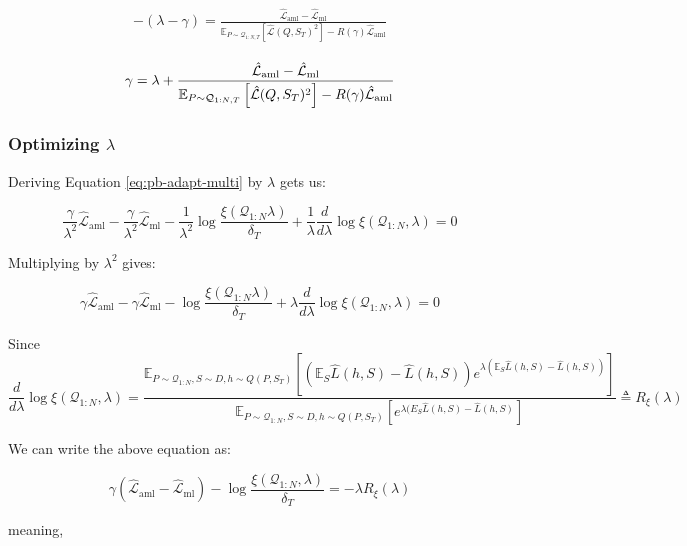 \documentclass{article}
\theoremstyle{definition}
\newcommand{\Expect}[2]{\mathbb{E}_{#1}\left [#2 \right ]}
\begin{document}
\begin{align*} 
\begin{split}
-(\lambda-\gamma) = \frac{\hat{\mathcal{L}}_{\mathrm{aml}}-\hat{\mathcal{L}}_{\mathrm{ml}}}{\Expect{P\sim \mathcal{Q}_{1:N,T}}{\hat{\mathcal{L}}(Q,S_T)^2}-R(\gamma)\hat{\mathcal{L}}_{\mathrm{aml}}}
\end{split}
\end{align*}

\begin{align} \label{eq:meta-pb-gamma}
\begin{split}
\gamma = \lambda+\frac{\hat{\mathcal{L}}_{\mathrm{aml}}-\hat{\mathcal{L}}_{\mathrm{ml}}}{\Expect{P\sim \mathcal{Q}_{1:N,T}}{\hat{\mathcal{L}}(Q,S_T)^2}-R(\gamma)\hat{\mathcal{L}}_{\mathrm{aml}}}
\end{split}\hfill
\end{align}

\subsubsection{Optimizing $\lambda$}

Deriving Equation \ref{eq:pb-adapt-multi} by $\lambda$ gets us:

$$\frac{\gamma}{\lambda^2} \hat{\mathcal{L}}_{\mathrm{aml}}-\frac{\gamma}{\lambda^2}\hat{\mathcal{L}}_{\mathrm{ml}}-\frac{1}{\lambda^2}\log\frac{\xi(\mathcal{Q}_{1:N}\lambda)}{\delta_T}+\frac{1}{\lambda}\frac{d}{d\lambda}\log\xi(\mathcal{Q}_{1:N},\lambda)=0$$

Multiplying by $\lambda^2$ gives:

$$\gamma \hat{\mathcal{L}}_{\mathrm{aml}}-\gamma\hat{\mathcal{L}}_{\mathrm{ml}}-\log\frac{\xi(\mathcal{Q}_{1:N}\lambda)}{\delta_T}+\lambda\frac{d}{d\lambda}\log\xi(\mathcal{Q}_{1:N},\lambda)=0$$

Since 
$$\frac{d}{d\lambda}\log\xi(\mathcal{Q}_{1:N},\lambda)=\frac{\Expect{P\sim \mathcal{Q}_{1:N},S\sim D,h\sim Q(P,S_T)}{(\mathbb{E}_S\hat{L}(h, S)-\hat{L}(h, S))e^{\lambda(\mathbb{E}_S\hat{L}(h, S)-\hat{L}(h, S))} }}{\Expect{P\sim \mathcal{Q}_{1:N},S\sim D,h\sim Q(P,S_T)}{e^{\lambda(E_S\hat{L}(h, S)-\hat{L}(h, S)} }}\triangleq R_\xi(\lambda)$$

We can write the above equation as:

$$\gamma(\hat{\mathcal{L}}_{\mathrm{aml}}-\hat{\mathcal{L}}_{\mathrm{ml}})-\log\frac{\xi(\mathcal{Q}_{1:N},\lambda)}{\delta_T}=-\lambda R_\xi(\lambda)$$

meaning,
\end{document}
